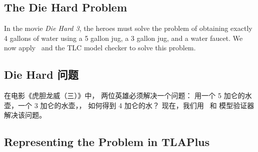 
\begin{en}
\newpage
\vspace{-\baselineskip}%

\section{The Die Hard Problem} 

In the movie \emph{Die Hard 3}, the heroes must solve the problem of
obtaining exactly 4 gallons of water using a 5 gallon jug, a 3 gallon
jug, and a water faucet.  We now apply \tlaplus\ and the TLC
model checker to solve this problem.
\end{en}

\begin{ch}
\newpage
\vspace{-\baselineskip}%

\section{Die Hard 问题} 

在电影《虎胆龙威（三）》中，
两位英雄必须解决一个问题：
用一个 5 加仑的水壶，一个 3 加仑的水壶，，
如何得到 4 加仑的水？
现在，我们用 \tlaplus\ 和 \tlc{} 模型验证器解决该问题。
\end{ch}

\subsection{Representing the Problem in TLAPlus}%

